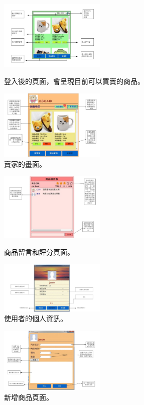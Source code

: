 \documentclass{scrreprt}
\begin{document}
\begin{CJK}{UTF8}{bkai}
\begin{figure}[t]
	\centering
	\includegraphics[width=0.45\textwidth]{search.pdf}
	\caption{登入後的頁面，會呈現目前可以買賣的商品。}
	\centering
	\includegraphics[width=0.45\textwidth]{note.pdf}
	\caption{賣家的畫面。}
\end{figure}

\begin{figure}[t]
	\centering
	\includegraphics[width=0.45\textwidth]{star.pdf}
	\caption{商品留言和評分頁面。}
	\centering
	\includegraphics[width=0.45\textwidth]{Info.pdf}
	\caption{使用者的個人資訊。}
\end{figure}

\begin{figure}[t]
	\centering
	\includegraphics[width=0.45\textwidth]{addpro.pdf}
	\caption{新增商品頁面。}
\end{figure}


\end{CJK}
\end{document}

